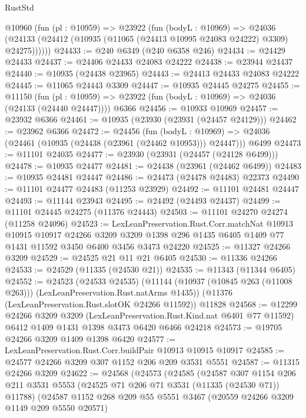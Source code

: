 \begin{lexlean}{RustStd}
\begin{coremodule}
{\begin{coremodule}
{{{{{{{{{{{{{{{{{{{{{{{{{{{{{{{{{{{{{{{{{{{{{{{{{{{{{{{{{{{{{{{{{{{{{{{{{{{{{{{{{{{{{    @10960
      (fun (pl : @10959) =>
      @23922
        (fun (bodyL : @10969) =>
        @24036 (@24133 (@24412 (@10935 (@11065 (@24413 @10995 @24083 @24222) @3309) @24275))))))
@24433 := @240 @6349 (@240 @6358 @246)
@24434 := @24429 @24433
@24437 := @24406 @24433 @24083 @24222
@24438 := @23944 @24437
@24440 := @10935 (@24438 @23965)
@24443 := @24413 @24433 @24083 @24222
@24445 := @11065 @24443 @3309
@24447 := @10935 @24445 @24275
@24455 := @11150
    (fun (pl : @10959) => @23922 (fun (bodyL : @10969) => @24036 (@24133 (@24440 @24447))))
    @6366
@24456 := @10933 @10969
@24457 := @23932 @6366
@24461 := @10935 (@23930 (@23931 (@24457 @24129)))
@24462 := @23962 @6366
@24472 := @24456
    (fun (bodyL : @10969) => @24036 (@24461 (@10935 (@24438 (@23961 (@24462 @10953))) @24447)))
    @6499
@24473 := @11101 @24035
@24477 := @23930 (@23931 (@24457 (@24128 @6499)))
@24478 := @10935 @24477
@24481 := @24438 (@23961 (@24462 @6499))
@24483 := @10935 @24481 @24447
@24486 := @24473 (@24478 @24483) @22373
@24490 := @11101 @24477 @24483 (@11253 @23929)
@24492 := @11101 @24481 @24447
@24493 := @11144 @23943
@24495 := @24492 (@24493 @24437)
@24499 := @11101 @24445 @24275 (@11376 @24443)
@24503 := @11101 @24270 @24274 (@11258 @24096)
@24523 := LexLeanPreservation.Rust.Corr.matchNat
    @10913
    @10915
    @10917
    @24266
    @3209
    @3209
    @1398
    @296
    @1435
    @6405
    @1409
    @77
    @1431
    @11592
    @3450
    @6400
    @3456
    @3473
    @24220
@24525 := @11327 @24266 @3209
@24529 := @24525 @21 @11 @21 @6405
@24530 := @11336 @24266
@24533 := @24529 (@11335 (@24530 @21))
@24535 := @11343 (@11344 @6405)
@24552 := @24523
    (@24533 @24535)
    (@11144 (@10937 (@10845 @263 (@11008 @263))) (LexLeanPreservation.Rust.natArms @1435))
    (@11376 (LexLeanPreservation.Rust.slotOK @24266 @11592))
    @11828
@24568 := @12299
    @24266
    @3209
    @3209
    (LexLeanPreservation.Rust.Kind.nat @6401 @77 @11592)
    @6412
    @1409
    @1431
    @1398
    @3473
    @6420
    @6466
    @24218
@24573 := @19705 @24266 @3209 @1409 @1398 @6420
@24577 := LexLeanPreservation.Rust.Corr.buildPair @10913 @10915 @10917
@24585 := @24577 @24266 @3209 @307 @1152 @206 @209 @3531 @5551
@24587 := @11315 @24266 @3209
@24622 := @24568
    (@24573
      (@24585
        (@24587
          @307
          @1154
          @206
          @211
          @3531
          @5553
          (@24525 @71 @206 @71 @3531 (@11335 (@24530 @71)) @11788)
          (@24587
            @1152
            @268
            @209
            @55
            @5551
            @3467
            (@20559 @24266 @3209 @1149 @209 @5550 @20571)
}}}}}}}}}}}}}}}}}}}}}}}}}}}}}}}}}}}}}}}}}}}}}}}}}}}}}}}}}}}}}}}}}}}}}}}}}}}}}}}}}}}}}
\end{coremodule}}
\end{coremodule}
\end{lexlean}
